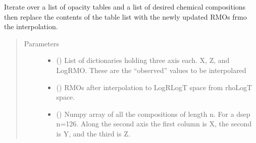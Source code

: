 \documentclass[letterpaper,10pt,english]{sphinxmanual}
\begin{document}

\begin{fulllineitems}
\label{\detokenize{pyTOPSScrape.api:pyTOPSScrape.api.convert.rebuild_formated_tables}}
\sphinxAtStartPar
Iterate over a list of opacity tables and a list of desired chemical
compositions then replace the contents of the table list with the newly
updated RMOs frmo the interpolation.
\begin{quote}\begin{description}
\item[{Parameters}] \leavevmode\begin{itemize}
\item {} 
\sphinxAtStartPar
{} () \textendash{} List of dictionaries holding three axis each. X, Z, and LogRMO.
These are the “observed” values to be interpolared

\item {} 
\sphinxAtStartPar
{} () \textendash{} RMOs after interpolation to LogR\sphinxhyphen{}LogT space from rho\sphinxhyphen{}LogT space.

\item {} 
\sphinxAtStartPar
{} (\sphinxstyleliteralemphasis{\sphinxupquote{(}}\sphinxstyleliteralemphasis{\sphinxupquote{(}}\sphinxstyleliteralemphasis{\sphinxupquote{, }}\sphinxstyleliteralemphasis{\sphinxupquote{)}}\sphinxstyleliteralemphasis{\sphinxupquote{)}}) \textendash{} Numpy array of all the compositions of length n.  For a dsep n=126.
Along the second axis the first column is X, the second is Y, and
the third is Z.


\end{itemize}
\end{description}
\end{quote}
\end{fulllineitems}
\end{document}
